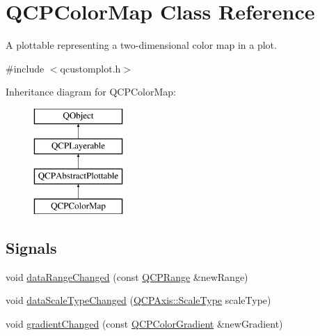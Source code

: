 \hypertarget{class_q_c_p_color_map}{}\section{Q\+C\+P\+Color\+Map Class Reference}
\label{class_q_c_p_color_map}


A plottable representing a two-\/dimensional color map in a plot.  




{\ttfamily \#include $<$qcustomplot.\+h$>$}

Inheritance diagram for Q\+C\+P\+Color\+Map\+:\begin{figure}[H]
\begin{center}
\leavevmode
\includegraphics[height=4.000000cm]{df/dea/class_q_c_p_color_map}
\end{center}
\end{figure}
\subsection*{Signals}
\begin{DoxyCompactItemize}
\item 
void \mbox{\hyperlink{class_q_c_p_color_map_a83ae5be3903da493f732e1a5c14fd807}{data\+Range\+Changed}} (const \mbox{\hyperlink{class_q_c_p_range}{Q\+C\+P\+Range}} \&new\+Range)
\item 
void \mbox{\hyperlink{class_q_c_p_color_map_a978d5d5c9f68cffef8c902b855c04490}{data\+Scale\+Type\+Changed}} (\mbox{\hyperlink{class_q_c_p_axis_a36d8e8658dbaa179bf2aeb973db2d6f0}{Q\+C\+P\+Axis\+::\+Scale\+Type}} scale\+Type)
\item 
void \mbox{\hyperlink{class_q_c_p_color_map_a31a12726736b1ac274e7b1d8dfb67468}{gradient\+Changed}} (const \mbox{\hyperlink{class_q_c_p_color_gradient}{Q\+C\+P\+Color\+Gradient}} \&new\+Gradient)
\end{DoxyCompactItemize}
